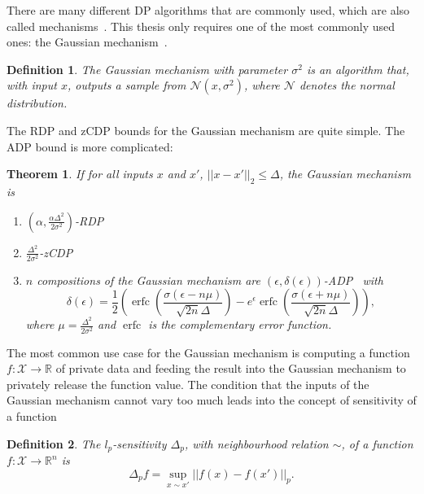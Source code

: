 \documentclass[english,twoside,openright]{HYgraduMLDS}
\newtheorem{theorem}{Theorem}
\newtheorem{definition}{Definition}
\newcommand{\R}{\mathbb{R}}
\newcommand{\calx}{{\mathcal{X}}}
\newcommand{\caln}{{\mathcal{N}}}
\DeclareMathOperator{\erfc}{erfc}
\begin{document}
There are many different DP algorithms that are commonly used, which are also
called mechanisms~\cite{DwR14}. This thesis only requires one of the most commonly 
used ones: the Gaussian mechanism~\cite{DwR14}.
\begin{definition}
    The Gaussian mechanism with parameter \(\sigma^2\) 
    is an algorithm that, with input \(x\), 
    outputs a sample from \(\caln(x, \sigma^2)\), where \(\caln\) denotes 
    the normal distribution.
\end{definition}

The RDP and zCDP bounds for the Gaussian 
mechanism are quite simple. The ADP bound is more complicated:

\begin{theorem}\label{gauss-DP-bounds}
    If for all inputs \(x\) and \(x'\), \(||x - x'||_2 \leq \Delta\),
    the Gaussian mechanism is 
    \begin{enumerate}
        \item 
            \((\alpha, \frac{\alpha \Delta^2}{2\sigma^2})\)-RDP~\cite{Mironov17}
        \item 
            \(\frac{\Delta^2}{2\sigma^2}\)-zCDP~\cite{BuS16}
        \item 
            \(n\) compositions of the Gaussian mechanism are 
            \((\epsilon, \delta(\epsilon))\)-ADP~\cite{Sommer2019} with 
            \[
                \delta(\epsilon) 
                = \frac{1}{2}\left(
                    \erfc\left(\frac{\sigma(\epsilon - n\mu)}{\sqrt{2n}\Delta}\right)
                    - e^\epsilon \erfc\left(\frac{\sigma(\epsilon + n\mu)}{\sqrt{2n}\Delta}\right)
                \right),
            \]
            where \(\mu = \frac{\Delta^2}{2\sigma^2}\) and \(\erfc\) is 
            the complementary error function.
    \end{enumerate}
\end{theorem}

The most common use case for the Gaussian mechanism is computing a 
function \(f\colon \calx \to \R\) of private data and feeding the result into 
the Gaussian mechanism to privately release the function value. 
The condition that the inputs 
of the Gaussian mechanism cannot vary too much leads into the concept of 
sensitivity of a function
\begin{definition}
    The \(l_p\)-sensitivity \(\Delta_p\), with neighbourhood relation \(\sim\),
    of a function \(f\colon \calx \to \R^n\)
    is 
    \[
        \Delta_p f = \sup_{x\sim x'}||f(x) - f(x')||_p.
    \]
\end{definition}
\end{document}
